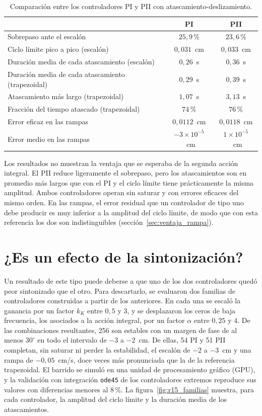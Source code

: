 \begin{table}[ht]
\centering
\caption{Comparación entre los controladores PI y PII con atascamiento-deslizamiento.}
\label{tab:pi_pii}
\begin{tabular}{|l|c|c|}
\hline
 & PI & PII \\ \hline
Sobrepaso ante el escalón & $25{,}9$\,\% & $23{,}6$\,\% \\ \hline
Ciclo límite pico a pico (escalón) & $0{,}031$~cm & $0{,}033$~cm \\ \hline
Duración media de cada atascamiento (escalón) & $0{,}26$~s & $0{,}36$~s \\ \hline
Duración media de cada atascamiento (trapezoidal) & $0{,}29$~s & $0{,}39$~s \\ \hline
Atascamiento más largo (trapezoidal) & $1{,}07$~s & $3{,}13$~s \\ \hline
Fracción del tiempo atascado (trapezoidal) & $74$\,\% & $76$\,\% \\ \hline
Error eficaz en las rampas & $0{,}0112$~cm & $0{,}0118$~cm \\ \hline
Error medio en las rampas & $-3\times10^{-5}$~cm & $1\times10^{-5}$~cm \\ \hline
\end{tabular}
\end{table}

Los resultados no muestran la ventaja que se esperaba de la segunda acción integral. El PII reduce ligeramente el sobrepaso, pero los atascamientos son en promedio más largos que con el PI y el ciclo límite tiene prácticamente la misma amplitud. Ambos controladores operan sin saturar y con errores eficaces del mismo orden. En las rampas, el error residual que un controlador de tipo uno debe producir es muy inferior a la amplitud del ciclo límite, de modo que con esta referencia los dos son indistinguibles (sección~\ref{sec:ventaja_rampa}).

\section{¿Es un efecto de la sintonización?}\label{sec:barrido_familias}

Un resultado de este tipo puede deberse a que uno de los dos controladores quedó peor sintonizado que el otro. Para descartarlo, se evaluaron dos familias de controladores construidas a partir de los anteriores. En cada una se escaló la ganancia por un factor $k_K$ entre $0{,}5$ y $3$, y se desplazaron los ceros de baja frecuencia, los asociados a la acción integral, por un factor $\alpha$ entre $0{,}25$ y $4$. De las combinaciones resultantes, 256 son estables con un margen de fase de al menos $30^\circ$ en todo el intervalo de $-3$ a $-2$~cm. De ellas, 54 PI y 51 PII completan, sin saturar ni perder la estabilidad, el escalón de $-2$ a $-3$~cm y una rampa de $-0{,}05$~cm/s, doce veces más pronunciada que la de la referencia trapezoidal. El barrido se simuló en una unidad de procesamiento gráfico (GPU), y la validación con integración \texttt{ode45} de los controladores extremos reproduce sus valores con diferencias menores al 8\,\%. La figura~\ref{fig:r15_familias} muestra, para cada controlador, la amplitud del ciclo límite y la duración media de los atascamientos.


